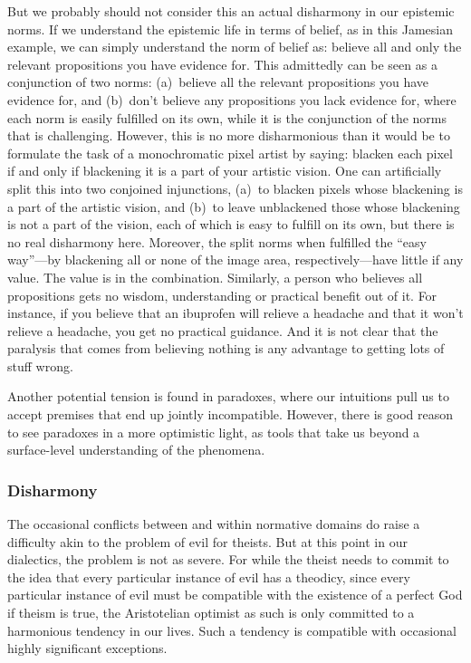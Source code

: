 But we probably should not consider this an actual disharmony in our epistemic norms. If we understand the epistemic
life in terms of belief, as in this Jamesian example, we can simply understand the norm of belief as: believe 
all and only the relevant propositions you have evidence for. This admittedly can be seen as a conjunction of 
two norms: (a)~believe all the relevant propositions you have evidence for, and (b)~don't believe any propositions 
you lack evidence for, where each norm is easily fulfilled on its own, while it is the conjunction of the norms that 
is challenging. However, this is no more disharmonious than it would be to formulate the task of a monochromatic pixel
artist by saying: blacken each pixel if and only if blackening it is a part of your artistic vision. One can artificially
split this into two conjoined injunctions, (a)~to blacken pixels whose blackening is a part of the artistic vision, and (b)~to 
leave unblackened those whose blackening is not a part of the vision, each of which is easy to fulfill on its own, but there
is no real disharmony here. Moreover, the split norms when fulfilled the ``easy way''---by blackening all or none of the 
image area, respectively---have little if any value. The value is in the combination. Similarly, a person who believes 
all propositions gets no wisdom, understanding or practical benefit out of it. For instance, if you believe that an ibuprofen 
will relieve a headache and that it won't relieve a headache, you get no practical guidance. And it is not clear that 
the paralysis that comes from believing nothing is any advantage to getting lots of stuff wrong.

Another potential tension is found in paradoxes, where our intuitions pull us to accept premises that end up jointly 
incompatible. However, there is good reason to see paradoxes in a more optimistic light, as tools that take us beyond
a surface-level understanding of the phenomena. 

\subsubsection{Disharmony}
The occasional conflicts between and within normative domains do raise a difficulty akin to the problem of evil for theists.
But at this point in our dialectics, the problem is not as severe. For while the theist needs to commit to the idea that 
every particular instance of evil has a theodicy, since every particular instance of evil must be compatible with the existence
of a perfect God if theism is true, the Aristotelian optimist as such is only committed to a harmonious tendency in our 
lives. Such a tendency is compatible with occasional highly significant exceptions.


